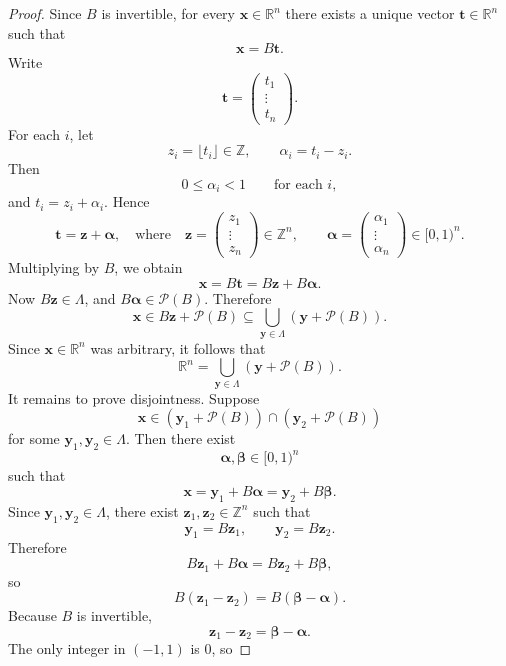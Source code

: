 \begin{proof}
	Since \(B\) is invertible, for every \(\mathbf x\in\mathbb R^n\) there exists a unique vector \(\mathbf t\in\mathbb R^n\) such that
	\[
	\mathbf x=B\mathbf t.
	\]
	Write
	\[
	\mathbf t=
	\begin{pmatrix}
		t_1\\
		\vdots\\
		t_n
	\end{pmatrix}.
	\]
	For each \(i\), let
	\[
	z_i=\lfloor t_i\rfloor\in\mathbb Z,
	\qquad
	\alpha_i=t_i-z_i.
	\]
	Then
	\[
	0\le \alpha_i<1
	\qquad\text{for each }i,
	\]
	and
	$t_i=z_i+\alpha_i$. Hence
	\[
	\mathbf t=\mathbf z+\boldsymbol\alpha,\quad\text{where}\quad
	\mathbf z=
	\begin{pmatrix}
		z_1\\
		\vdots\\
		z_n
	\end{pmatrix}\in\mathbb Z^n,
	\qquad
	\boldsymbol\alpha=
	\begin{pmatrix}
		\alpha_1\\
		\vdots\\
		\alpha_n
	\end{pmatrix}\in[0,1)^n.
	\]
	Multiplying by \(B\), we obtain
	\[
	\mathbf x=B\mathbf t=B\mathbf z+B\boldsymbol\alpha.
	\]
	Now \(B\mathbf z\in\Lambda\), and \(B\boldsymbol\alpha\in\mathcal P(B)\). Therefore
	\[
	\mathbf x\in B\mathbf z+\mathcal P(B)\subseteq \bigcup_{\mathbf y\in\Lambda}(\mathbf y+\mathcal P(B)).
	\]
	Since \(\mathbf x\in\mathbb R^n\) was arbitrary, it follows that
	\[
	\mathbb R^n=\bigcup_{\mathbf y\in\Lambda}(\mathbf y+\mathcal P(B)).
	\]
	It remains to prove disjointness. Suppose
	\[
	\mathbf x\in(\mathbf y_1+\mathcal P(B))\cap(\mathbf y_2+\mathcal P(B))
	\]
	for some \(\mathbf y_1,\mathbf y_2\in\Lambda\). Then there exist
	\[
	\boldsymbol\alpha,\boldsymbol\beta\in[0,1)^n
	\]
	such that
	\[
	\mathbf x=\mathbf y_1+B\boldsymbol\alpha=\mathbf y_2+B\boldsymbol\beta.
	\]
	Since \(\mathbf y_1,\mathbf y_2\in\Lambda\), there exist \(\mathbf z_1,\mathbf z_2\in\mathbb Z^n\) such that
	\[
	\mathbf y_1=B\mathbf z_1,
	\qquad
	\mathbf y_2=B\mathbf z_2.
	\]
	Therefore
	\[
	B\mathbf z_1+B\boldsymbol\alpha
	=
	B\mathbf z_2+B\boldsymbol\beta,
	\]
	so
	\[
	B(\mathbf z_1-\mathbf z_2)=B(\boldsymbol\beta-\boldsymbol\alpha).
	\]
	Because \(B\) is invertible,
	\[
	\mathbf z_1-\mathbf z_2=\boldsymbol\beta-\boldsymbol\alpha.
	\]
	The only integer in \((-1,1)\) is \(0\), so

\end{proof}
